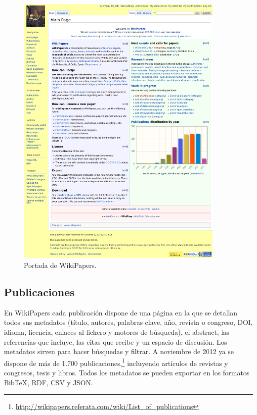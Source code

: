 \documentclass[11pt,onecolumn]{article}
\begin{document}
\begin{figure}[htb]
\centering
\includegraphics[width=0.9\textwidth]{wpfull.png}
\caption{Portada de WikiPapers.}
\label{fig:wpfull}
\end{figure}

\subsection{Publicaciones}
En WikiPapers cada publicación dispone de una página en la que se detallan todos sus metadatos (título, autores, palabras clave, año, revista o congreso, DOI, idioma, licencia, enlaces al fichero y motores de búsqueda), el abstract, las referencias que incluye, las citas que recibe y un espacio de discusión. Los metadatos sirven para hacer búsquedas y filtrar. A noviembre de 2012 ya se dispone de más de 1.700 publicaciones,\footnote{\href{http://wikipapers.referata.com/wiki/List_of_publications}{http://wikipapers.referata.com/wiki/List\_of\_publications}} incluyendo artículos de revistas y congresos, tesis y libros. Todos los metadatos se pueden exportar en los formatos BibTeX, RDF, CSV y JSON.
\end{document}
